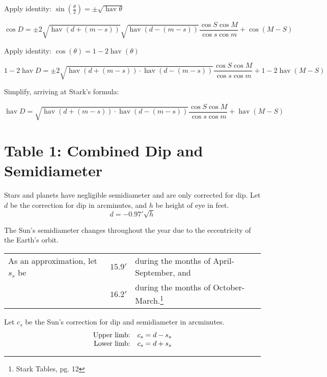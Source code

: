\documentclass[letterpaper]{article}
\DeclareMathOperator{\hav}{hav}
\numberwithin{equation}{section}
\begin{document}
	Apply identity: $\sin\left(\tfrac{\theta}{2}\right) = \pm \sqrt{\hav \theta}$

	\begin{equation}
	\cos D = \pm 2 \sqrt{\hav (d + (m-s))} \sqrt{\hav (d - (m-s))} \frac{\cos S \cos M}{\cos s \cos m}  + \cos (M-S)
	\end{equation}

	Apply identity: $\cos (\theta) = 1 - 2 \hav (\theta)$

	\begin{equation}
	1 - 2 \hav D = \pm 2 \sqrt{\hav (d + (m-s)) \cdot \hav (d - (m-s))} \frac{\cos S \cos M}{\cos s \cos m}  + 1 - 2 \hav (M-S)
	\end{equation}

	Simplify, arriving at Stark's formula:

	\begin{equation}
	\hav D = \sqrt{\hav (d + (m-s)) \cdot \hav (d - (m-s))} \frac{\cos S \cos M}{\cos s \cos m} + \hav (M-S)
	\end{equation}

\clearpage \section{Table 1: Combined Dip and Semidiameter}

	Stars and planets have negligible semidiameter and are only corrected for dip. Let $d$ be the correction for dip in arcminutes, and $h$ be height of eye in feet.
	 \begin{equation}
	d = -0.97' \sqrt{h}
	\end{equation}  

	The Sun's semidiameter changes throughout the year due to the eccentricity of the Earth's orbit.
	\setlength\tabcolsep{2pt}
	\begin{tabularx}{\textwidth}{@{}llX@{}}
	As an approximation, let $s_s$ be
	  & $15.9'$ & during the months of April-September, and \\
	  & $16.2'$ & during the months of October-March.\footnote{Stark Tables, pg. 12} \\
	\end{tabularx}
	Let $c_s$ be the Sun's correction for dip and semidiameter in arcminutes.
	\begin{equation}
	\begin{array}{@{}rl@{}}
	\text{Upper limb:} & c_s = d - s_s \\
	\text{Lower limb:} & c_s = d + s_s
	\end{array}
	\end{equation}
\end{document}
